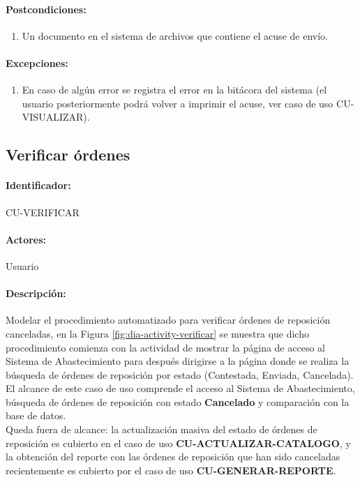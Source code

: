 \paragraph{Postcondiciones:}
\begin{enumerate}
  \item Un documento en el sistema de archivos que contiene el acuse de envío.
\end{enumerate}
\paragraph{Excepciones:}
\begin{enumerate}
  \item En caso de algún error se registra el error en la bitácora del sistema (el usuario posteriormente podrá volver a imprimir el acuse, ver caso de uso CU-VISUALIZAR).
\end{enumerate}


\subsection{Verificar órdenes}\label{cu-verificar}
\paragraph{Identificador:}
CU-VERIFICAR
\paragraph{Actores:}
Usuario
\paragraph{Descripción:}
Modelar el procedimiento automatizado para verificar órdenes de reposición canceladas, en la Figura \ref{fig:dia-activity-verificar} se muestra que dicho procedimiento comienza con la actividad de mostrar la página de acceso al Sistema de Abastecimiento para después dirigirse a la página donde se realiza la búsqueda de órdenes de reposición por estado (Contestada, Enviada, Cancelada).\\
El alcance de este caso de uso comprende el acceso al Sistema de Abastecimiento, búsqueda de órdenes de reposición con estado \textbf{Cancelado} y comparación con la base de datos.\\
Queda fuera de alcance: la actualización masiva del estado de órdenes de reposición es cubierto en el caso de uso \textbf{CU-ACTUALIZAR-CATALOGO}, y la obtención del reporte con las órdenes de reposición que han sido canceladas recientemente es cubierto por el caso de uso \textbf{CU-GENERAR-REPORTE}.
